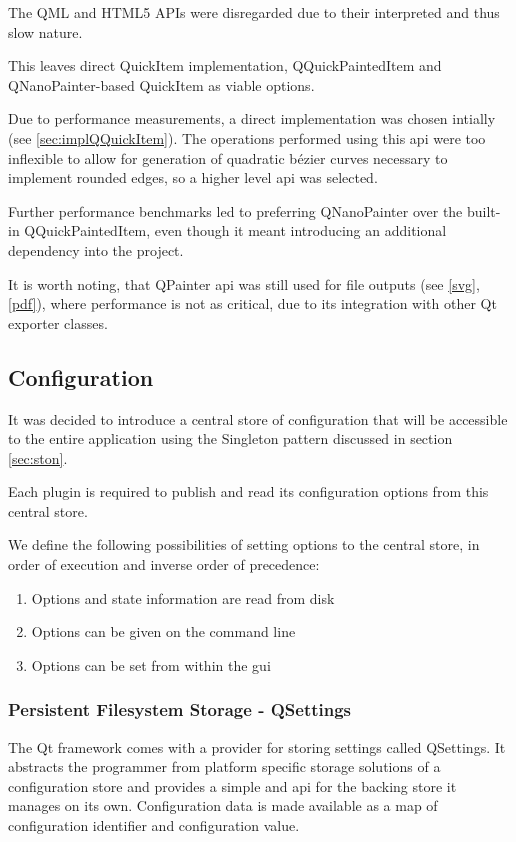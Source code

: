 The QML and HTML5 APIs were disregarded due to their interpreted and thus slow nature.

This leaves direct QuickItem implementation, QQuickPaintedItem and QNanoPainter-based QuickItem as viable options.

Due to performance measurements, a direct implementation was chosen intially (see \ref{sec:implQQuickItem}). The operations performed using this \gls{api} were too inflexible to allow for generation of quadratic bézier curves necessary to implement rounded edges, so a higher level \gls{api} was selected.

Further performance benchmarks led to preferring QNanoPainter over the built-in QQuickPaintedItem, even though it meant introducing an additional dependency into the project.

It is worth noting, that QPainter \gls{api} was still used for file outputs (see \ref{svg}, \ref{pdf}), where performance is not as critical, due to its integration with other Qt exporter classes.

\subsection{Configuration}
It was decided to introduce a central store of configuration that will be accessible to the entire application using the Singleton pattern discussed in section \ref{sec:ston}.

Each plugin is required to publish and read its configuration options from this central store.

We define the following possibilities of setting options to the central store, in order of execution and inverse order of precedence:
\begin{enumerate}
	\item Options and state information are read from disk
	\item Options can be given on the command line
	\item Options can be set from within the \gls{gui}
\end{enumerate}

\subsubsection{Persistent Filesystem Storage - QSettings}
The Qt framework comes with a provider for storing settings called QSettings. It abstracts the programmer from platform specific storage solutions of a configuration store and provides a simple  and  \gls{api} for the backing store it manages on its own. Configuration data is made available as a map of configuration identifier and configuration value.


